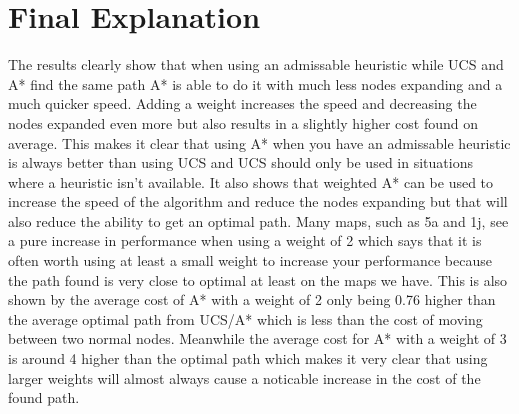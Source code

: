 \documentclass[11pt]{article} %
\begin{document}
\section{Final Explanation}
The results clearly show that when using an admissable heuristic while UCS and A* find the same path A* is able to do it with much less nodes expanding and a much quicker speed. Adding a weight increases the speed and decreasing the nodes expanded even more but also results in a slightly higher cost found on average. This makes it clear that using A* when you have an admissable heuristic is always better than using UCS and UCS should only be used in situations where a heuristic isn't available. It also shows that weighted A* can be used to increase the speed of the algorithm and reduce the nodes expanding but that will also reduce the ability to get an optimal path. Many maps, such as 5a and 1j, see a pure increase in performance when using a weight of 2 which says that it is often worth using at least a small weight to increase your performance because the path found is very close to optimal at least on the maps we have. This is also shown by the average cost of A* with a weight of 2 only being 0.76 higher than the average optimal path from UCS/A* which is less than the cost of moving between two normal nodes. Meanwhile the average cost for A* with a weight of 3 is around 4 higher than the optimal path which makes it very clear that using larger weights will almost always cause a noticable increase in the cost of the found path. 
\end{document}
